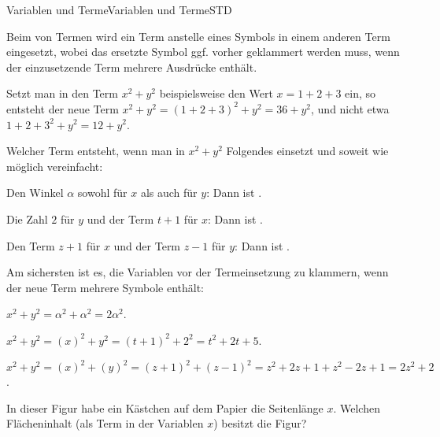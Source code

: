 \begin{MXContent}{Variablen und Terme}{Variablen und Terme}{STD}
\begin{MInfo}
Beim  von Termen wird ein Term anstelle eines Symbols in einem anderen Term eingesetzt,
wobei das ersetzte Symbol ggf. vorher geklammert werden muss, wenn der einzusetzende Term mehrere Ausdrücke enthält.
\end{MInfo}

\begin{MExample}
Setzt man in den Term $x^2+y^2$ beispielsweise den Wert $x=1+2+3$ ein, so entsteht der neue Term $x^2+y^2=(1+2+3)^2+y^2=36+y^2$, und nicht etwa
$1+2+3^2+y^2=12+y^2$.
\end{MExample}

\begin{MExercise}
Welcher Term entsteht, wenn man in $x^2+y^2$ Folgendes einsetzt und soweit wie möglich vereinfacht: %
\begin{MExerciseItems}
\item{Den Winkel $\alpha$ sowohl für $x$ als auch für $y$: Dann ist .} 
\item{Die Zahl $2$ für $y$ und der Term $t+1$ für $x$: Dann ist .}
\item{Den Term $z+1$ für $x$ und der Term $z-1$ für $y$: Dann ist .}
\end{MExerciseItems}

\begin{MHint}{\iSolution}
Am sichersten ist es, die Variablen vor der Termeinsetzung zu klammern, wenn der neue Term mehrere Symbole enthält:
\begin{MExerciseItems}
\item{$x^2+y^2=\alpha^2+\alpha^2=2\alpha^2$.}
\item{$x^2+y^2=(x)^2+y^2=(t+1)^2+2^2=t^2+2t+5$.}
\item{$x^2+y^2=(x)^2+(y)^2=(z+1)^2+(z-1)^2=z^2+2z+1+z^2-2z+1=2z^2+2$.}
\end{MExerciseItems}
\end{MHint}
\end{MExercise}

\begin{MExercise}
In dieser Figur habe ein Kästchen auf dem Papier die Seitenlänge $x$. Welchen Flächeninhalt (als Term in der Variablen $x$) besitzt
die Figur?


\end{MExercise}
\end{MXContent}

